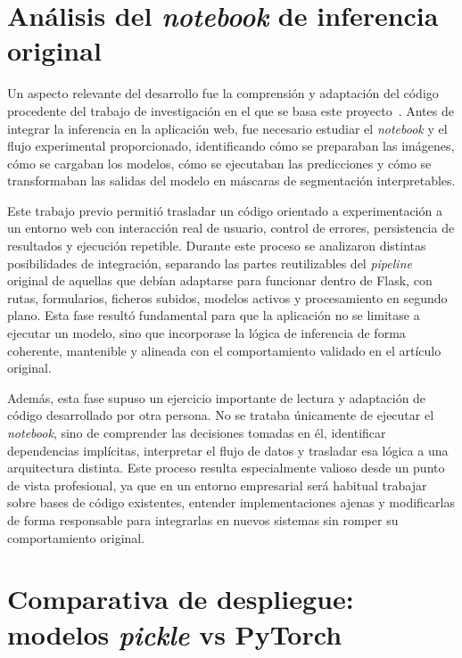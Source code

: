 
\section{Análisis del \textit{notebook} de inferencia original}

Un aspecto relevante del desarrollo fue la comprensión y adaptación del código procedente del trabajo de investigación en el que se basa este proyecto~\cite{diezpastora2025trails}. Antes de integrar la inferencia en la aplicación web, fue necesario estudiar el \textit{notebook} y el flujo experimental proporcionado, identificando cómo se preparaban las imágenes, cómo se cargaban los modelos, cómo se ejecutaban las predicciones y cómo se transformaban las salidas del modelo en máscaras de segmentación interpretables.

Este trabajo previo permitió trasladar un código orientado a experimentación a un entorno web con interacción real de usuario, control de errores, persistencia de resultados y ejecución repetible. Durante este proceso se analizaron distintas posibilidades de integración, separando las partes reutilizables del \textit{pipeline} original de aquellas que debían adaptarse para funcionar dentro de Flask, con rutas, formularios, ficheros subidos, modelos activos y procesamiento en segundo plano. Esta fase resultó fundamental para que la aplicación no se limitase a ejecutar un modelo, sino que incorporase la lógica de inferencia de forma coherente, mantenible y alineada con el comportamiento validado en el artículo original.

Además, esta fase supuso un ejercicio importante de lectura y adaptación de código desarrollado por otra persona. No se trataba únicamente de ejecutar el \textit{notebook}, sino de comprender las decisiones tomadas en él, identificar dependencias implícitas, interpretar el flujo de datos y trasladar esa lógica a una arquitectura distinta. Este proceso resulta especialmente valioso desde un punto de vista profesional, ya que en un entorno empresarial será habitual trabajar sobre bases de código existentes, entender implementaciones ajenas y modificarlas de forma responsable para integrarlas en nuevos sistemas sin romper su comportamiento original.

\section{Comparativa de despliegue: modelos \textit{pickle} vs PyTorch}

